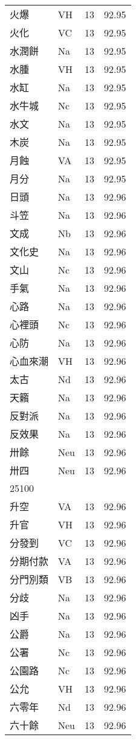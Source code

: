\documentclass[twocolumn]{book}
\begin{document}
\begin{supertabular}{llrr}
火爆 & VH & 13 &  92.95\\
火化 & VC & 13 &  92.95\\
水潤餅 & Na & 13 &  92.95\\
水腫 & VH & 13 &  92.95\\
水缸 & Na & 13 &  92.95\\
水牛城 & Nc & 13 &  92.95\\
水文 & Na & 13 &  92.95\\
木炭 & Na & 13 &  92.95\\
月蝕 & VA & 13 &  92.95\\
月分 & Na & 13 &  92.95\\
日頭 & Na & 13 &  92.96\\
斗笠 & Na & 13 &  92.96\\
文成 & Nb & 13 &  92.96\\
文化史 & Na & 13 &  92.96\\
文山 & Nc & 13 &  92.96\\
手氣 & Na & 13 &  92.96\\
心路 & Na & 13 &  92.96\\
心裡頭 & Nc & 13 &  92.96\\
心防 & Na & 13 &  92.96\\
心血來潮 & VH & 13 &  92.96\\
太古 & Nd & 13 &  92.96\\
天籟 & Na & 13 &  92.96\\
反對派 & Na & 13 &  92.96\\
反效果 & Na & 13 &  92.96\\
卅餘 & Neu & 13 &  92.96\\
卅四 & Neu & 13 &  92.96\\
25100\\
升空 & VA & 13 &  92.96\\
升官 & VH & 13 &  92.96\\
分發到 & VC & 13 &  92.96\\
分期付款 & VA & 13 &  92.96\\
分門別類 & VB & 13 &  92.96\\
分歧 & Na & 13 &  92.96\\
凶手 & Na & 13 &  92.96\\
公爵 & Na & 13 &  92.96\\
公署 & Nc & 13 &  92.96\\
公園路 & Nc & 13 &  92.96\\
公允 & VH & 13 &  92.96\\
六零年 & Nd & 13 &  92.96\\
六十餘 & Neu & 13 &  92.96\\

\end{supertabular}
\end{document}
